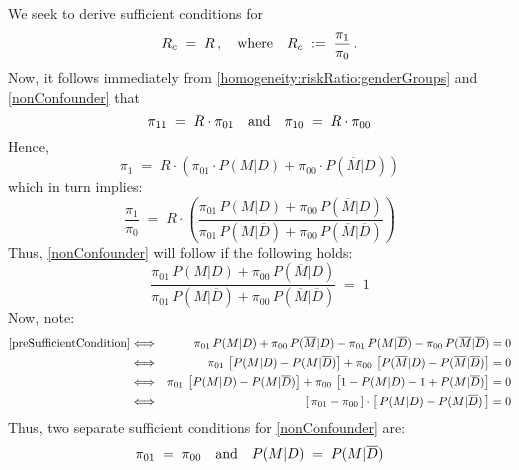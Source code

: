 We seek to derive sufficient conditions for
\begin{equation}
\label{nonConfounder}
R_{c} \; = \; R\,,
\quad\textnormal{where}\quad
R_{c} \; := \; \dfrac{\pi_{1}}{\pi_{0}}\,.
\end{equation}
Now, it follows immediately from \eqref{homogeneity:riskRatio:genderGroups}
and \eqref{nonConfounder} that
\begin{equation*}
\pi_{11} \; = \; R\cdot\pi_{01}
\quad\textnormal{and}\quad
\pi_{10} \; = \; R\cdot\pi_{00}
\end{equation*}
Hence,
\begin{equation*}
\pi_{1} \; = \; R\cdot\left(\pi_{01}\cdot P(M \vert D) + \pi_{00}\cdot P(\overline{M}\vert D)\right)
\end{equation*}
which in turn implies:
\begin{equation*}
\dfrac{\pi_{1}}{\pi_{0}}
\; = \;
R\cdot\left(
\dfrac{\pi_{01}\,P(M \vert D)            + \pi_{00}\,P(\overline{M}\vert D)}
      {\pi_{01}\,P(M \vert \overline{D}) + \pi_{00}\,P(\overline{M} \vert \overline{D})}
\right)
\end{equation*}
Thus, \eqref{nonConfounder} will follow if the following holds:
\begin{equation}
\label{preSufficientCondition}
\dfrac{\pi_{01}\,P(M \vert D)            + \pi_{00}\,P(\overline{M}\vert D)}
      {\pi_{01}\,P(M \vert \overline{D}) + \pi_{00}\,P(\overline{M} \vert \overline{D})}
\; = \; 1
\end{equation}
Now, note:
\begin{eqnarray*}
\textnormal{\eqref{preSufficientCondition}}
&\Longleftrightarrow&
     \pi_{01}\,P(M \vert D)            + \pi_{00}\,P(\overline{M}\vert D)
   - \pi_{01}\,P(M \vert \overline{D}) - \pi_{00}\,P(\overline{M} \vert \overline{D}) = 0
\\
&\Longleftrightarrow&
     \pi_{01}\,\left[P(M \vert D) - P(M \vert \overline{D})\right]
   + \pi_{00}\,\left[P(\overline{M}\vert D) - P(\overline{M} \vert \overline{D})\right] = 0
\\
&\Longleftrightarrow&
     \pi_{01}\,\left[P(M \vert D) - P(M \vert \overline{D})\right]
   + \pi_{00}\,\left[1-P(M\vert D) - 1+P(M \vert \overline{D})\right] = 0
\\
&\Longleftrightarrow&
     \left[\,\pi_{01} - \pi_{00}\,\right]
     \cdot
     \left[\,P(M \vert D) - P(M \vert \overline{D})\,\right] = 0
\end{eqnarray*}
Thus, two separate sufficient conditions for \eqref{nonConfounder} are:
\begin{equation*}
\pi_{01} \; = \; \pi_{00}
\quad\textnormal{and}\quad
P(M \vert D) \; = \; P(M \vert \overline{D})
\end{equation*}
